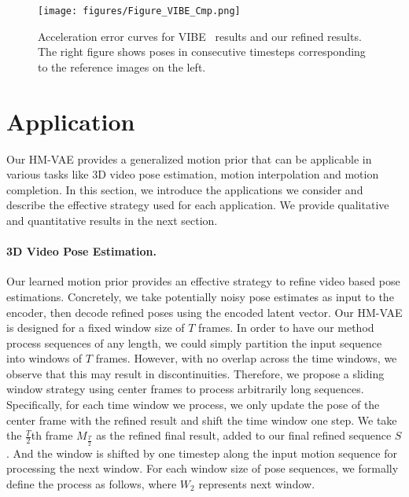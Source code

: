 \begin{figure*}[t!]
\vspace{-2mm}
\begin{center}   \texttt{[image: figures/Figure\_VIBE\_Cmp.png]}
\end{center}
\vspace{-5mm}
\caption{Acceleration error curves for VIBE~\cite{kocabas2020vibe} results and our refined results. The right figure shows poses in consecutive timesteps corresponding to the reference images on the left.}
\label{vibe_cmp}
\vspace{-3mm}
\end{figure*}

\section{Application}  \label{sec:application}


Our HM-VAE provides a generalized motion prior that can be applicable in various tasks like 3D video pose estimation, motion interpolation and motion completion. In this section, we introduce the applications we consider and describe the effective strategy used for each application. We provide qualitative and quantitative results in the next section.

\paragraph{3D Video Pose Estimation.}
Our learned motion prior provides an effective strategy to refine video based pose estimations. Concretely, we take potentially noisy pose estimates as input to the encoder, then decode refined poses using the encoded latent vector.
Our HM-VAE is designed for a fixed window size of $T$ frames. In order to have our method process sequences of any length, we could simply partition the input sequence into windows of $T$ frames. However, with no overlap across the time windows, we observe that this may result in discontinuities. 
Therefore, we propose a sliding window strategy using center frames to process arbitrarily long sequences. Specifically, for each time window we process, we only update the pose of the center frame with the refined result and shift the time window one step. We take the $\frac{T}{2}$th frame $M_{\frac{T}{2}}$ as the refined final result, added to our final refined sequence $S$.
And the window is shifted by one timestep along the input motion sequence for processing the next window.
For each window size of pose sequences, we formally define the process as follows, where $W_2$ represents next window. 




